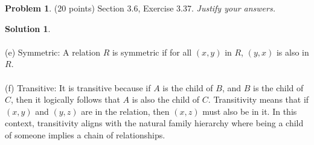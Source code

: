 \documentclass{article}
\theoremstyle{definition}
\newtheorem{problem}{Problem}
\newtheorem*{solution}{Solution}
\begin{document}
\newpage
\begin{problem} (20 points) Section 3.6, Exercise 3.37. \textit{Justify your answers.}
\end{problem}
\begin{solution} 
  ~\\
  ~\\
  (e) Symmetric: A relation $R$ is symmetric if for all $(x, y)$ in $R$, $(y, x)$ is also in $R$.
  ~\\
  ~\\
  (f) Transitive: It is transitive because if $A$ is the child of $B$, and $B$ is the child of $C$, then it logically follows that $A$ is also the child of $C$. Transitivity means that if $(x, y)$ and $(y, z)$ are in the relation, then $(x, z)$ must also be in it. In this context, transitivity aligns with the natural family hierarchy where being a child of someone implies a chain of relationships.

\end{solution}
\end{document}
